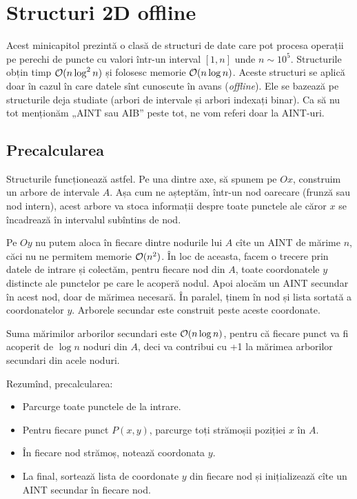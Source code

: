 \documentclass[../main.tex]{subfiles}
\begin{document}
\chapter{Structuri 2D offline}

Acest minicapitol prezintă o clasă de structuri de date care pot procesa operații pe perechi de puncte cu valori într-un interval $[1, n]$ unde $n \sim 10^5$. Structurile obțin timp $\mathcal{O}(n \log^2 n)$ și folosesc memorie $\mathcal{O}(n \log n)$. Aceste structuri se aplică doar în cazul în care datele sînt cunoscute în avans (\textit{offline}). Ele se bazează pe structurile deja studiate (arbori de intervale și arbori indexați binar). Ca să nu tot menționăm „AINT sau AIB” peste tot, ne vom referi doar la AINT-uri.

\section{Precalcularea}

Structurile funcționează astfel. Pe una dintre axe, să spunem pe $Ox$, construim un arbore de intervale $A$. Așa cum ne așteptăm, într-un nod oarecare (frunză sau nod intern), acest arbore va stoca informații despre toate punctele ale căror $x$ se încadrează în intervalul subîntins de nod.

Pe $Oy$ nu putem aloca în fiecare dintre nodurile lui $A$ cîte un AINT de mărime $n$, căci nu ne permitem memorie $\mathcal{O}(n^2)$. În loc de aceasta, facem o trecere prin datele de intrare și colectăm, pentru fiecare nod din $A$, toate coordonatele $y$ distincte ale punctelor pe care le acoperă nodul. Apoi alocăm un AINT secundar în acest nod, doar de mărimea necesară. În paralel, ținem în nod și lista sortată a coordonatelor $y$. Arborele secundar este construit peste aceste coordonate.

Suma mărimilor arborilor secundari este $\mathcal{O}(n \log n)$, pentru că fiecare punct va fi acoperit de $\log n$ noduri din $A$, deci va contribui cu +1 la mărimea arborilor secundari din acele noduri.

Rezumînd, precalcularea:

\begin{itemize}
  \item Parcurge toate punctele de la intrare.
  \item Pentru fiecare punct $P(x, y)$, parcurge toți strămoșii poziției $x$ în $A$.
  \item În fiecare nod strămoș, notează coordonata $y$.
  \item La final, sortează lista de coordonate $y$ din fiecare nod și inițializează cîte un AINT secundar în fiecare nod.
\end{itemize}
\end{document}
